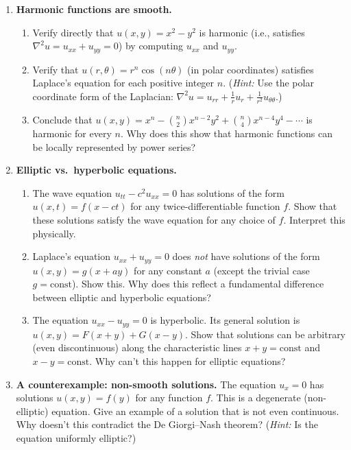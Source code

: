 \begin{enumerate}

    \item \textbf{Harmonic functions are smooth.}
    \begin{enumerate}
        \item Verify directly that $u(x,y) = x^2 - y^2$ is harmonic (i.e., satisfies $\nabla^2 u = u_{xx} + u_{yy} = 0$) by computing $u_{xx}$ and $u_{yy}$.
        \item Verify that $u(r, \theta) = r^n \cos(n\theta)$ (in polar coordinates) satisfies Laplace's equation for each positive integer $n$. (\emph{Hint:} Use the polar coordinate form of the Laplacian: $\nabla^2 u = u_{rr} + \frac{1}{r} u_r + \frac{1}{r^2} u_{\theta\theta}$.)
        \item Conclude that $u(x,y) = x^n - \binom{n}{2} x^{n-2} y^2 + \binom{n}{4} x^{n-4} y^4 - \cdots$ is harmonic for every $n$. Why does this show that harmonic functions can be locally represented by power series?
    \end{enumerate}

    \item \textbf{Elliptic vs.\ hyperbolic equations.}
    \begin{enumerate}
        \item The wave equation $u_{tt} - c^2 u_{xx} = 0$ has solutions of the form $u(x,t) = f(x - ct)$ for any twice-differentiable function $f$. Show that these solutions satisfy the wave equation for any choice of $f$. Interpret this physically.
        \item Laplace's equation $u_{xx} + u_{yy} = 0$ does \emph{not} have solutions of the form $u(x,y) = g(x + ay)$ for any constant $a$ (except the trivial case $g = \text{const}$). Show this. Why does this reflect a fundamental difference between elliptic and hyperbolic equations?
        \item The equation $u_{xx} - u_{yy} = 0$ is hyperbolic. Its general solution is $u(x,y) = F(x+y) + G(x-y)$. Show that solutions can be arbitrary (even discontinuous) along the characteristic lines $x + y = \text{const}$ and $x - y = \text{const}$. Why can't this happen for elliptic equations?
    \end{enumerate}

    \item \textbf{A counterexample: non-smooth solutions.} The equation $u_x = 0$ has solutions $u(x,y) = f(y)$ for any function $f$. This is a degenerate (non-elliptic) equation. Give an example of a solution that is not even continuous. Why doesn't this contradict the De Giorgi--Nash theorem? (\emph{Hint:} Is the equation uniformly elliptic?)


\end{enumerate}
